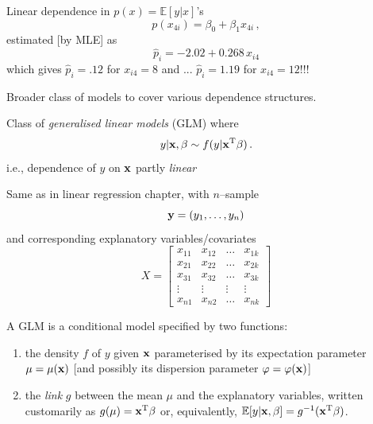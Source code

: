 \begin{slide}
\smallskip\pause
Linear dependence in $p(x)=\mathbb{E}[y|x]$'s
$$
p(x_{4i})=\beta_0+\beta_1 x_{4i}\,,
$$
\pause estimated [by MLE] as
$$
\hat p_i=-2.02+0.268\,x_{i4}
$$
which gives $\hat p_i=.12$ for $x_{i4}=8$ and ... \pause
$\hat p_i=1.19$ for $x_{i4}=12$!!!


\end{slide}\begin{slide}

Broader class of models to cover various dependence structures. 

\pause
\vs Class of {\em generalised linear models} (GLM) where
$$
y|\mathbf{x},\beta \sim f(y|\mathbf{x}^{\mathrm{T}}\beta)\,.
$$
i.e., dependence of $y$ on $\mathbf{x}$ partly {\em linear} 

\end{slide}\begin{slide}

Same as in linear regression chapter, with $n$--sample
$$
\mathbf{y}=\left(y_1,\ldots,y_n\right)
$$ 
and corresponding explanatory variables/covariates
$$
X=\left[\begin{array}{cccc}
 x_{11} & x_{12} & \ldots & x_{1k} \\
 x_{21} & x_{22} & \ldots & x_{2k} \\
 x_{31} & x_{32} & \ldots & x_{3k} \\
 \vdots & \vdots & \vdots & \vdots \\
 x_{n1} & x_{n2} & \ldots & x_{nk}
\end{array}\right]
$$

\end{slide}\begin{slide}

\begin{definition}[GLM]
A GLM is a conditional model specified by two functions:
\begin{enumerate}
\item the density $f$ of $y$ given $\mathbf{x}$ parameterised by its expectation parameter $\mu=\mu(\mathbf{x})$ 
[and possibly its dispersion parameter $\varphi=\varphi(\mathbf{x})$]
\pause
\item the {\em link} $g$ between the mean $\mu$ and the explanatory variables, written customarily as $g(\mu)=\mathbf{x}^{\mathrm{T}}\beta$
or, equivalently, $\mathbb{E}[y|\mathbf{x},\beta] =g^{-1}(\mathbf{x}^{\mathrm{T}}\beta)$. 
\end{enumerate}
\end{definition}


\end{slide}
